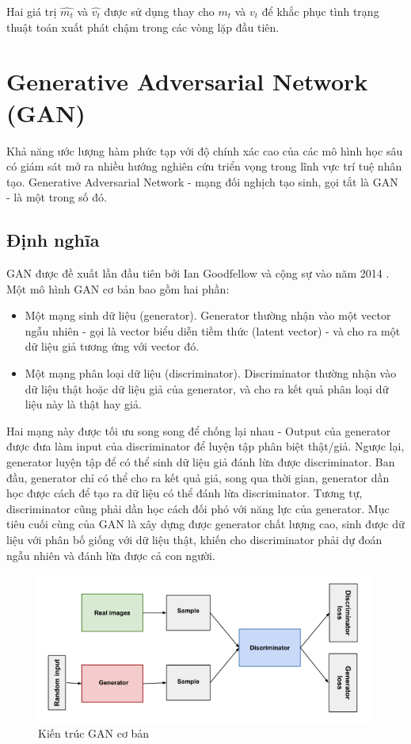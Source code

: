 \documentclass[12pt]{extreport}
\begin{document}
Hai giá trị $ \hat{m_t} $ và $ \hat{v_t} $ được sử dụng thay cho  $ m_t $ và  $ v_t $ để khắc phục tình trạng thuật toán xuất phát chậm trong các vòng lặp đầu tiên.

\section{Generative Adversarial Network (GAN)}

Khả năng ước lượng hàm phức tạp với độ chính xác cao của các mô hình học sâu có giám sát mở ra nhiều hướng nghiên cứu triển vọng trong lĩnh vực trí tuệ nhân tạo. Generative Adversarial Network - mạng đối nghịch tạo sinh, gọi tắt là GAN - là một trong số đó.

\subsection{Định nghĩa}

GAN được đề xuất lần đầu tiên bởi Ian Goodfellow và cộng sự vào năm 2014 \cite{NIPS2014_5ca3e9b1}. Một mô hình GAN cơ bản bao gồm hai phần:

\begin{itemize}
    \item Một mạng sinh dữ liệu (generator). Generator thường nhận vào một vector ngẫu nhiên - gọi là vector biểu diễn tiềm thức (latent vector) - và cho ra một dữ liệu giả tương ứng với vector đó.
    \item Một mạng phân loại dữ liệu (discriminator). Discriminator thường nhận vào dữ liệu thật hoặc dữ liệu giả của generator, và cho ra kết quả phân loại dữ liệu này là thật hay giả.
\end{itemize}

Hai mạng này được tối ưu song song để chống lại nhau - Output của generator được đưa làm input của discriminator để luyện tập phân biệt thật/giả. Ngược lại, generator luyện tập để có thể sinh dữ liệu giả đánh lừa được discriminator. Ban đầu, generator chỉ có thể cho ra kết quả giả, song qua thời gian, generator dần học được cách để tạo ra dữ liệu có thể đánh lừa discriminator. Tương tự, discriminator cũng phải dần học cách đối phó với năng lực của generator. Mục tiêu cuối cùng của GAN là xây dựng được generator chất lượng cao, sinh được dữ liệu với phân bố giống với dữ liệu thật, khiến cho discriminator phải dự đoán ngẫu nhiên và đánh lừa được cả con người.

\begin{figure}[H]
    \centering
    \includegraphics[width=\textwidth]{figure13.png}
    \caption{Kiến trúc GAN cơ bản}
\end{figure}
\end{document}

